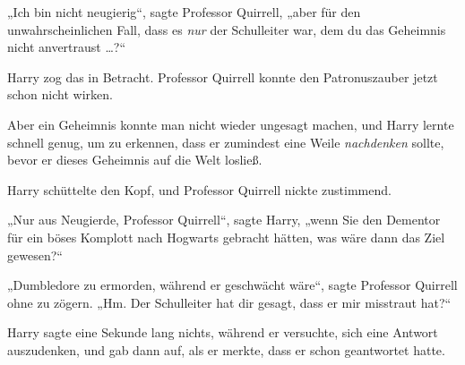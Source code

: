 „Ich bin nicht neugierig“, sagte Professor Quirrell, „aber für den unwahrscheinlichen Fall, dass es \emph{nur} der Schulleiter war, dem du das Geheimnis nicht anvertraust …?“

Harry zog das in Betracht. Professor Quirrell konnte den Patronuszauber jetzt schon nicht wirken.

Aber ein Geheimnis konnte man nicht wieder ungesagt machen, und Harry lernte schnell genug, um zu erkennen, dass er zumindest eine Weile \emph{nachdenken} sollte, bevor er dieses Geheimnis auf die Welt losließ.

Harry schüttelte den Kopf, und Professor Quirrell nickte zustimmend.

„Nur aus Neugierde, Professor Quirrell“, sagte Harry, „wenn Sie den Dementor für ein böses Komplott nach Hogwarts gebracht hätten, was wäre dann das Ziel gewesen?“

„Dumbledore zu ermorden, während er geschwächt wäre“, sagte Professor Quirrell ohne zu zögern. „Hm. Der Schulleiter hat dir gesagt, dass er mir misstraut hat?“

Harry sagte eine Sekunde lang nichts, während er versuchte, sich eine Antwort auszudenken, und gab dann auf, als er merkte, dass er schon geantwortet hatte.

